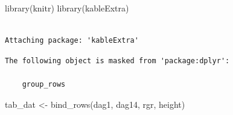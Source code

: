 \documentclass[
  letterpaper,
  DIV=11,
  numbers=noendperiod]{scrartcl}
\newenvironment{Shaded}{\begin{snugshade}}{\end{snugshade}}
\newcommand{\FunctionTok}[1]{\textcolor[rgb]{0.28,0.35,0.67}{#1}}
\newcommand{\NormalTok}[1]{\textcolor[rgb]{0.00,0.23,0.31}{#1}}
\newcommand{\OtherTok}[1]{\textcolor[rgb]{0.00,0.23,0.31}{#1}}
\begin{document}
\begin{Shaded}
\begin{Highlighting}[]
\FunctionTok{library}\NormalTok{(knitr)}
\FunctionTok{library}\NormalTok{(kableExtra)}
\end{Highlighting}
\end{Shaded}

\begin{verbatim}

Attaching package: 'kableExtra'
\end{verbatim}

\begin{verbatim}
The following object is masked from 'package:dplyr':

    group_rows
\end{verbatim}

\begin{Shaded}
\begin{Highlighting}[]
\NormalTok{tab\_dat }\OtherTok{\textless{}{-}} \FunctionTok{bind\_rows}\NormalTok{(dag1, dag14, rgr, height)}


\end{Highlighting}
\end{Shaded}
\end{document}
